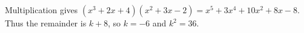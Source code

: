 Multiplication gives $(x^3+2x+4)(x^2+3x-2)=x^5+3x^4+10x^2+8x-8$. Thus the remainder is $k+8$, so $k=-6$ and $\boxed{k^2=36}$.
